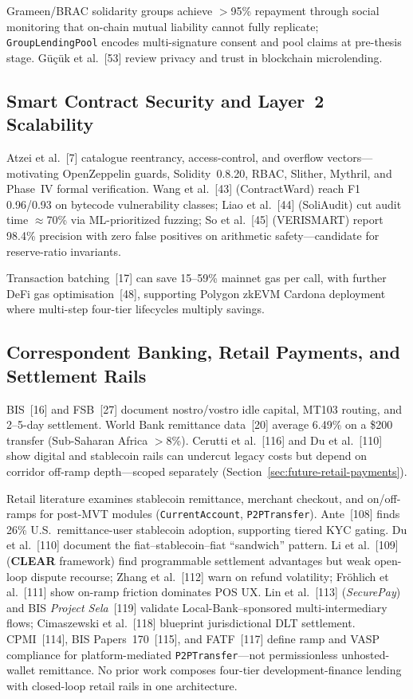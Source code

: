 \documentclass[12pt, a4paper]{report}
\begin{document}
Grameen/BRAC solidarity groups achieve $>$95\% repayment through social monitoring that on-chain mutual liability cannot fully replicate; \texttt{GroupLendingPool} encodes multi-signature consent and pool claims at pre-thesis stage. G\"{u}\c{c}\"uk et al.~[53] review privacy and trust in blockchain microlending.

\subsection{Smart Contract Security and Layer~2 Scalability}

Atzei et al.~[7] catalogue reentrancy, access-control, and overflow vectors---motivating OpenZeppelin guards, Solidity~0.8.20, RBAC, Slither, Mythril, and Phase~IV formal verification. Wang et al.~[43] (ContractWard) reach F1 0.96/0.93 on bytecode vulnerability classes; Liao et al.~[44] (SoliAudit) cut audit time $\approx$70\% via ML-prioritized fuzzing; So et al.~[45] (VERISMART) report 98.4\% precision with zero false positives on arithmetic safety---candidate for reserve-ratio invariants.

Transaction batching~[17] can save 15--59\% mainnet gas per call, with further DeFi gas optimisation~[48], supporting Polygon zkEVM Cardona deployment where multi-step four-tier lifecycles multiply savings.

\subsection{Correspondent Banking, Retail Payments, and Settlement Rails}
\label{sec:lit-retail-payments}

BIS~[16] and FSB~[27] document nostro/vostro idle capital, MT103 routing, and 2--5-day settlement. World Bank remittance data~[20] average 6.49\% on a \$200 transfer (Sub-Saharan Africa $>$8\%). Cerutti et al.~[116] and Du et al.~[110] show digital and stablecoin rails can undercut legacy costs but depend on corridor off-ramp depth---scoped separately (Section~\ref{sec:future-retail-payments}).

Retail literature examines stablecoin remittance, merchant checkout, and on/off-ramps for post-MVT modules (\texttt{CurrentAccount}, \texttt{P2PTransfer}). Ante~[108] finds 26\% U.S.\ remittance-user stablecoin adoption, supporting tiered KYC gating. Du et al.~[110] document the fiat--stablecoin--fiat ``sandwich'' pattern. Li et al.~[109] (\textbf{CLEAR} framework) find programmable settlement advantages but weak open-loop dispute recourse; Zhang et al.~[112] warn on refund volatility; Fr\"{o}hlich et al.~[111] show on-ramp friction dominates POS UX. Lin et al.~[113] (\textit{SecurePay}) and BIS \textit{Project Sela}~[119] validate Local-Bank--sponsored multi-intermediary flows; Cimaszewski et al.~[118] blueprint jurisdictional DLT settlement. CPMI~[114], BIS Papers~170~[115], and FATF~[117] define ramp and VASP compliance for platform-mediated \texttt{P2PTransfer}---not permissionless unhosted-wallet remittance. No prior work composes four-tier development-finance lending with closed-loop retail rails in one architecture.
\end{document}
